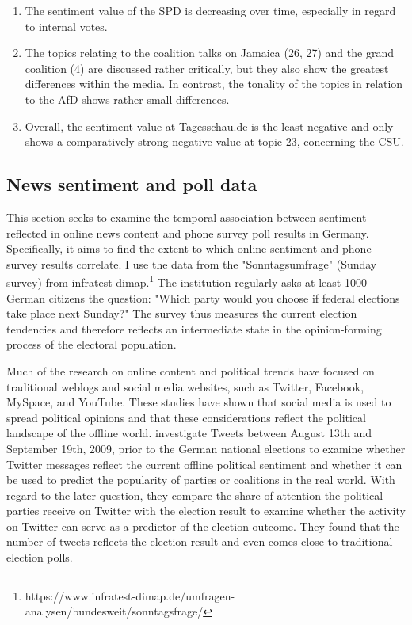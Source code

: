 \documentclass[12pt,a4paper,notitlepage]{article}
\begin{document}
\begin{enumerate}
	\item The sentiment value of the SPD is decreasing over time, especially in regard to internal votes. 
	\item The topics relating to the coalition talks on Jamaica (26, 27) and the grand coalition (4) are discussed rather critically, but they also show the greatest differences within the media. In contrast, the tonality of the topics in relation to the AfD shows rather small differences. 
	\item Overall, the sentiment value at Tagesschau.de is the least negative and only shows a comparatively strong negative value at topic 23, concerning the CSU.
\end{enumerate} 

\subsection{News sentiment and poll data}\label{ch_correlation}

This section seeks to examine the temporal association between sentiment reflected in online news content and phone survey poll results in Germany. Specifically, it aims to find the extent to which online sentiment and phone survey results correlate. I use the data from the "Sonntagsumfrage" (Sunday survey) from infratest dimap.\footnote{https://www.infratest-dimap.de/umfragen-analysen/bundesweit/sonntagsfrage/} The institution regularly asks at least 1000 German citizens the question: "Which party would you choose if federal elections take place next Sunday?" The survey thus measures the current election tendencies and therefore reflects an intermediate state in the opinion-forming process of the electoral population.

Much of the research on online content and political trends have focused on traditional weblogs and social media websites, such as Twitter, Facebook, MySpace, and YouTube. These studies have shown that social media is used to spread political opinions and that these considerations reflect the political landscape of the offline world. \citet{tumasjan_predicting_2010} investigate Tweets between August 13th and September 19th, 2009, prior to the German national elections to examine whether Twitter messages reflect the current offline political sentiment and whether it can be used to predict the popularity of parties or coalitions in the real world. With regard to the later question, they compare the share of attention the political parties receive on Twitter with the election result to examine whether the activity on Twitter can serve as a predictor of the election outcome. They found that the number of tweets reflects the election result and even comes close to traditional election polls.
\end{document}
